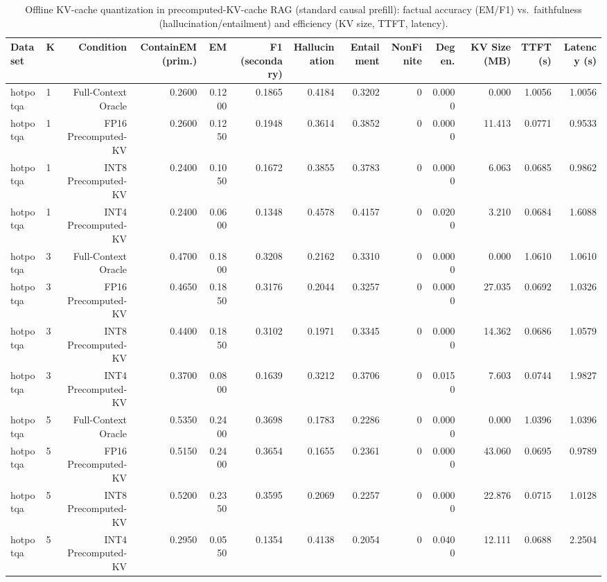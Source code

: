 \begin{table}[t]
\centering
\small
\begin{tabular}{llrrrrrrrrrrr}
\toprule
Dataset & K & Condition & ContainEM (prim.) & EM & F1 (secondary) & Hallucination & Entailment & NonFinite & Degen. & KV Size (MB) & TTFT (s) & Latency (s) \\
\midrule
hotpotqa & 1 & Full-Context Oracle & 0.2600 & 0.1200 & 0.1865 & 0.4184 & 0.3202 & 0 & 0.0000 & 0.000 & 1.0056 & 1.0056 \\
hotpotqa & 1 & FP16 Precomputed-KV & 0.2600 & 0.1250 & 0.1948 & 0.3614 & 0.3852 & 0 & 0.0000 & 11.413 & 0.0771 & 0.9533 \\
hotpotqa & 1 & INT8 Precomputed-KV & 0.2400 & 0.1050 & 0.1672 & 0.3855 & 0.3783 & 0 & 0.0000 & 6.063 & 0.0685 & 0.9862 \\
hotpotqa & 1 & INT4 Precomputed-KV & 0.2400 & 0.0600 & 0.1348 & 0.4578 & 0.4157 & 0 & 0.0200 & 3.210 & 0.0684 & 1.6088 \\
hotpotqa & 3 & Full-Context Oracle & 0.4700 & 0.1800 & 0.3208 & 0.2162 & 0.3310 & 0 & 0.0000 & 0.000 & 1.0610 & 1.0610 \\
hotpotqa & 3 & FP16 Precomputed-KV & 0.4650 & 0.1850 & 0.3176 & 0.2044 & 0.3257 & 0 & 0.0000 & 27.035 & 0.0692 & 1.0326 \\
hotpotqa & 3 & INT8 Precomputed-KV & 0.4400 & 0.1850 & 0.3102 & 0.1971 & 0.3345 & 0 & 0.0000 & 14.362 & 0.0686 & 1.0579 \\
hotpotqa & 3 & INT4 Precomputed-KV & 0.3700 & 0.0800 & 0.1639 & 0.3212 & 0.3706 & 0 & 0.0150 & 7.603 & 0.0744 & 1.9827 \\
hotpotqa & 5 & Full-Context Oracle & 0.5350 & 0.2400 & 0.3698 & 0.1783 & 0.2286 & 0 & 0.0000 & 0.000 & 1.0396 & 1.0396 \\
hotpotqa & 5 & FP16 Precomputed-KV & 0.5150 & 0.2400 & 0.3654 & 0.1655 & 0.2361 & 0 & 0.0000 & 43.060 & 0.0695 & 0.9789 \\
hotpotqa & 5 & INT8 Precomputed-KV & 0.5200 & 0.2350 & 0.3595 & 0.2069 & 0.2257 & 0 & 0.0000 & 22.876 & 0.0715 & 1.0128 \\
hotpotqa & 5 & INT4 Precomputed-KV & 0.2950 & 0.0550 & 0.1354 & 0.4138 & 0.2054 & 0 & 0.0400 & 12.111 & 0.0688 & 2.2504 \\
\bottomrule
\end{tabular}
\caption{Offline KV-cache quantization in precomputed-KV-cache RAG (standard causal prefill): factual accuracy (EM/F1) vs.\ faithfulness (hallucination/entailment) and efficiency (KV size, TTFT, latency).}
\label{tab:main}
\end{table}
